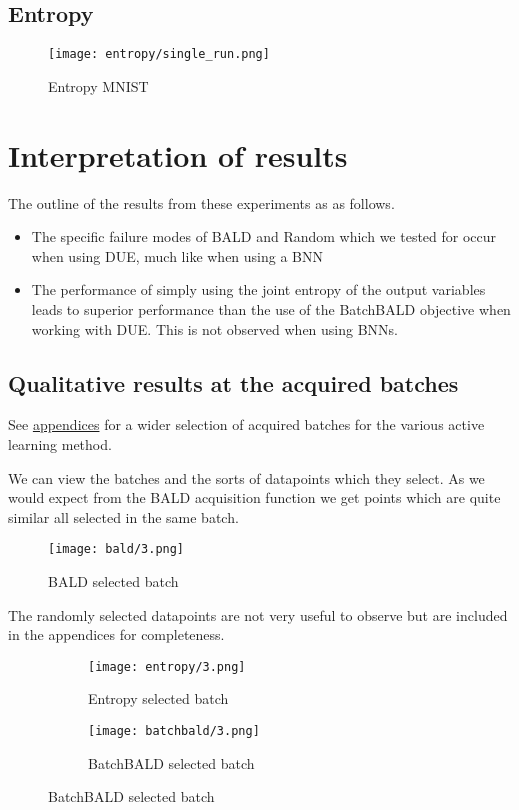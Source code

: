 \documentclass[12pt, a4paper]{report}
\theoremstyle{definition}
\theoremstyle{definition}
\theoremstyle{definition}
\begin{document}
\subsection{Entropy}
\begin{figure}[H]
    \centering
    \texttt{[image: entropy/single\_run.png]}
    \caption{Entropy MNIST}
\end{figure}



\section{Interpretation of results}

The outline of the results from these experiments as as follows.

\begin{itemize}
    \item The specific failure modes of BALD and Random which we tested for occur when using DUE, much like when using a BNN
    \item The performance of simply using the joint entropy of the output variables leads to superior performance than the use of the BatchBALD objective when working with DUE. This is not observed when using BNNs.
\end{itemize}


\subsection{Qualitative results at the acquired batches}

See \hyperref[sec:Batches]{appendices} for a wider selection of acquired batches for the various active learning method.

We can view the batches and the sorts of datapoints which they select. As we would expect from the BALD acquisition function we get points which are quite similar all selected in the same batch.

\begin{figure}[H]
    \centering
    \texttt{[image: bald/3.png]}
    \caption{BALD selected batch}
\end{figure}


The randomly selected datapoints are not very useful to observe but are included in the appendices for completeness.

\begin{figure}[H]
    \centering
    \begin{subfigure}[b]{0.3\textwidth}
        \centering
        \texttt{[image: entropy/3.png]}
        \caption{Entropy selected batch}
    \end{subfigure}
    \hfill
    \begin{subfigure}[b]{0.3\textwidth}
        \centering
        \texttt{[image: batchbald/3.png]}
        \caption{BatchBALD selected batch}
    \end{subfigure}
\end{figure}
\end{document}
